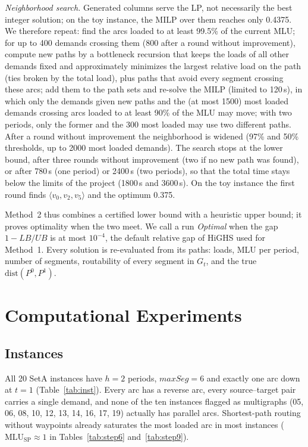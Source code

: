 \documentclass[conference]{IEEEtran}
\newcommand{\MLU}{\mathrm{MLU}}
\newcommand{\MLUsp}{\MLU_{\mathrm{SP}}}
\begin{document}
\emph{Neighborhood search.} Generated columns serve the LP, not necessarily the best integer solution; on the toy instance, the MILP over them reaches only 0.4375. We therefore repeat: find the arcs loaded to at least 99.5\% of the current MLU; for up to 400 demands crossing them (800 after a round without improvement), compute new paths by a bottleneck recursion that keeps the loads of all other demands fixed and approximately minimizes the largest relative load on the path (ties broken by the total load), plus paths that avoid every segment crossing these arcs; add them to the path sets and re-solve the MILP (limited to 120\,s), in which only the demands given new paths and the (at most 1500) most loaded demands crossing arcs loaded to at least 90\% of the MLU may move; with two periods, only the former and the 300 most loaded may use two different paths. After a round without improvement the neighborhood is widened (97\% and 50\% thresholds, up to 2000 most loaded demands). The search stops at the lower bound, after three rounds without improvement (two if no new path was found), or after 780\,s (one period) or 2400\,s (two periods), so that the total time stays below the limits of the project (1800\,s and 3600\,s). On the toy instance the first round finds $\langle v_0,v_2,v_5\rangle$ and the optimum 0.375.

Method~2 thus combines a certified lower bound with a heuristic upper bound; it proves optimality when the two meet. We call a run \emph{Optimal} when the gap $1-LB/UB$ is at most $10^{-4}$, the default relative gap of HiGHS used for Method~1. Every solution is re-evaluated from its paths: loads, MLU per period, number of segments, routability of every segment in $G_t$, and the true $\mathrm{dist}(P^0,P^1)$.

\section{Computational Experiments}\label{sec:exp}

\subsection{Instances}
All 20 SetA instances have $h=2$ periods, $maxSeg=6$ and exactly one arc down at $t=1$ (Table~\ref{tab:inst}). Every arc has a reverse arc, every source--target pair carries a single demand, and none of the ten instances flagged as multigraphs (05, 06, 08, 10, 12, 13, 14, 16, 17, 19) actually has parallel arcs. Shortest-path routing without waypoints already saturates the most loaded arc in most instances ($\MLUsp\approx1$ in Tables~\ref{tab:step6} and~\ref{tab:step9}).
\end{document}
